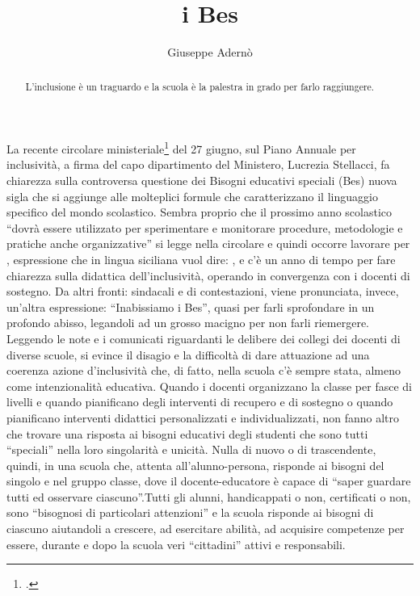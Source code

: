 \author{Giuseppe Adernò}
\title{ i Bes}
\label{cha:aderno0107013}
\begin{abstract}
L'inclusione è un traguardo e la scuola è la palestra in grado per farlo raggiungere.
\end{abstract}
\maketitle
La recente circolare ministeriale\footcite{Nota_1551_2013} del 27 giugno, sul Piano Annuale per inclusività, a firma del capo dipartimento del Ministero, Lucrezia Stellacci, fa chiarezza sulla controversa questione dei Bisogni educativi speciali (Bes) nuova sigla che si aggiunge alle molteplici formule che caratterizzano il linguaggio specifico del mondo scolastico.
Sembra proprio che il prossimo anno scolastico “dovrà essere utilizzato per sperimentare e monitorare procedure, metodologie e pratiche anche organizzative” si legge nella circolare e quindi occorre lavorare per , espressione che in lingua siciliana vuol dire: , e c'è un anno di tempo per fare chiarezza sulla didattica dell'inclusività, operando in convergenza con i docenti di sostegno.
Da altri fronti: sindacali e di contestazioni, viene pronunciata, invece, un'altra espressione: “Inabissiamo i Bes”, quasi per farli sprofondare in un profondo abisso, legandoli ad un grosso macigno per non farli riemergere.
Leggendo le note e i comunicati riguardanti le delibere dei collegi dei docenti di diverse scuole, si evince il disagio e la difficoltà di dare attuazione ad una coerenza azione d'inclusività che, di fatto, nella scuola c'è sempre stata, almeno come intenzionalità educativa. Quando i docenti organizzano la classe per fasce di livelli e quando pianificano degli interventi di recupero e di sostegno o quando pianificano interventi didattici personalizzati e individualizzati, non fanno altro che trovare una risposta ai bisogni educativi degli studenti che sono tutti “speciali” nella loro singolarità e unicità.
Nulla di nuovo o di trascendente, quindi, in una scuola che, attenta all'alunno-persona, risponde ai bisogni del singolo e nel gruppo classe, dove il docente-educatore è capace di “saper guardare tutti ed osservare ciascuno”.Tutti gli alunni, handicappati o non, certificati o non, sono “bisognosi di particolari attenzioni” e la scuola risponde ai bisogni di ciascuno aiutandoli a crescere, ad esercitare abilità, ad acquisire competenze per essere, durante e dopo la scuola veri “cittadini” attivi e responsabili.
